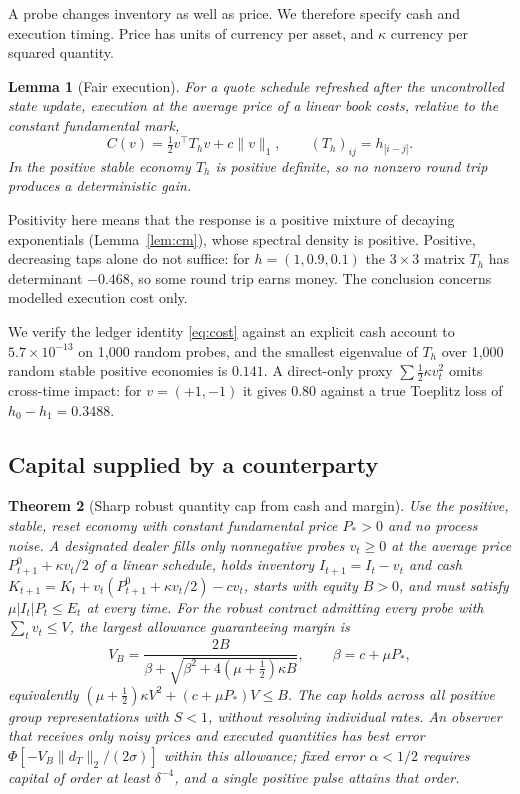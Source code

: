 \documentclass[12pt]{article}
\newtheorem{theorem}{Theorem}[section]
\newtheorem{lemma}[theorem]{Lemma}
\theoremstyle{definition}
\theoremstyle{remark}
\begin{document}
A probe changes inventory as well as price. We therefore specify cash and execution timing. Price has units of currency per asset, and $\kappa$ currency per squared quantity.

\begin{lemma}[Fair execution]\label{lem:toeplitz}
For a quote schedule refreshed after the uncontrolled state update, execution at the average price of a linear book costs, relative to the constant fundamental mark,
\begin{equation}\label{eq:cost}
C(v)=\tfrac12v^\top T_hv+c\|v\|_1,\qquad (T_h)_{ij}=h_{|i-j|}.
\end{equation}
In the positive stable economy $T_h$ is positive definite, so no nonzero round trip produces a deterministic gain.
\end{lemma}

Positivity here means that the response is a positive mixture of decaying exponentials (Lemma~\ref{lem:cm}), whose spectral density is positive. Positive, decreasing taps alone do not suffice: for $h=(1,0.9,0.1)$ the $3\times3$ matrix $T_h$ has determinant $-0.468$, so some round trip earns money. The conclusion concerns modelled execution cost only.

We verify the ledger identity \eqref{eq:cost} against an explicit cash account to $5.7\times10^{-13}$ on 1,000 random probes, and the smallest eigenvalue of $T_h$ over 1,000 random stable positive economies is $0.141$. A direct-only proxy $\sum\tfrac12\kappa v_t^2$ omits cross-time impact: for $v=(+1,-1)$ it gives $0.80$ against a true Toeplitz loss of $h_0-h_1=0.3488$.

\subsection{Capital supplied by a counterparty}

\begin{theorem}[Sharp robust quantity cap from cash and margin]\label{thm:cap}
Use the positive, stable, reset economy with constant fundamental price $P_*>0$ and no process noise. A designated dealer fills only nonnegative probes $v_t\ge0$ at the average price $P^0_{t+1}+\kappa v_t/2$ of a linear schedule, holds inventory $I_{t+1}=I_t-v_t$ and cash $K_{t+1}=K_t+v_t(P^0_{t+1}+\kappa v_t/2)-cv_t$, starts with equity $B>0$, and must satisfy $\mu|I_t|P_t\le E_t$ at every time. For the robust contract admitting every probe with $\sum_tv_t\le V$, the largest allowance guaranteeing margin is
\begin{equation}\label{eq:VB}
V_B=\frac{2B}{\beta+\sqrt{\beta^2+4(\mu+\tfrac12)\kappa B}},\qquad\beta=c+\mu P_*,
\end{equation}
equivalently $(\mu+\tfrac12)\kappa V^2+(c+\mu P_*)V\le B$. The cap holds across all positive group representations with $S<1$, without resolving individual rates. An observer that receives only noisy prices and executed quantities has best error $\Phi[-V_B\|d_T\|_2/(2\sigma)]$ within this allowance; fixed error $\alpha<1/2$ requires capital of order at least $\delta^{-4}$, and a single positive pulse attains that order.
\end{theorem}
\end{document}
